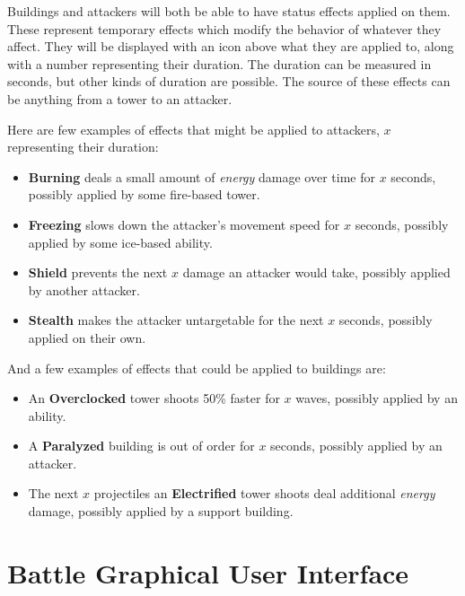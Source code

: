 \begin{notindemo}
    Buildings and attackers will both be able to have status effects applied on them.
    These represent temporary effects which modify the behavior of whatever they affect.
    They will be displayed with an icon above what they are applied to, along with a number representing their duration.
    The duration can be measured in seconds, but other kinds of duration are possible.
    The source of these effects can be anything from a tower to an attacker.

    Here are few examples of effects that might be applied to attackers, $x$ representing their duration:
    \begin{itemize}
        \item \textbf{Burning} deals a small amount of \emph{energy} damage over time for $x$ seconds, possibly applied by some fire-based tower.
        \item \textbf{Freezing} slows down the attacker's movement speed for $x$ seconds, possibly applied by some ice-based ability.
        \item \textbf{Shield} prevents the next $x$ damage an attacker would take, possibly applied by another attacker.
        \item \textbf{Stealth} makes the attacker untargetable for the next $x$ seconds, possibly applied on their own.
    \end{itemize}

    And a few examples of effects that could be applied to buildings are:
    \begin{itemize}
        \item An \textbf{Overclocked} tower shoots 50\% faster for $x$ waves, possibly applied by an ability.
        \item A \textbf{Paralyzed} building is out of order for $x$ seconds, possibly applied by an attacker.
        \item The next $x$ projectiles an \textbf{Electrified} tower shoots deal additional \emph{energy} damage, possibly applied by a support building.
    \end{itemize}
\end{notindemo}

\section{Battle Graphical User Interface}


